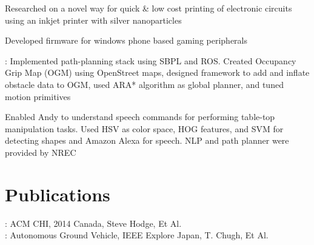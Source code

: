 \documentclass[]{resume-openfont}
\begin{document}
\begin{minipage}[t]{0.63\textwidth}
\begin{tightemize}
\item  Researched on a novel way for quick \& low cost printing of electronic circuits using an inkjet printer with silver nanoparticles
\item Developed firmware for windows phone based gaming peripherals 
\end{tightemize}
\sectionsep

\begin{tightemize}
\item \href{https://mrsdprojects.ri.cmu.edu/2015teamb/media/fall-and-spring-videos/}{}: Implemented path-planning stack using SBPL and ROS. Created Occupancy Grip  Map (OGM) using OpenStreet maps, designed framework to add and inflate obstacle data to OGM, used ARA* algorithm as global planner, and tuned motion primitives
\item \href{http://www.tusharchugh.com/works/andy/}{} 
Enabled Andy to understand speech commands for performing table-top manipulation tasks. Used HSV as color space, HOG features, and SVM for detecting shapes and Amazon Alexa for speech. NLP and path planner were provided by NREC
\end{tightemize}
\sectionsep


\section{Publications}
\href{http://research.microsoft.com/pubs/207114/2014-02-14\%20CHI\%20sticker\%20circuits.pdf}{}: ACM CHI, 2014 Canada, Steve Hodge, Et Al. \\
\href{http://ieeexplore.ieee.org/xpl/login.jsp?tp=&arnumber=5558532&url=http\%3A\%2F\%2Fieeexplore.ieee.org\%2Fxpls\%2Fabs_all.jsp\%3Farnumber\%3D5558532}{}: Autonomous Ground Vehicle, IEEE Explore Japan, T. Chugh, Et Al.




\end{minipage}
\end{document}
